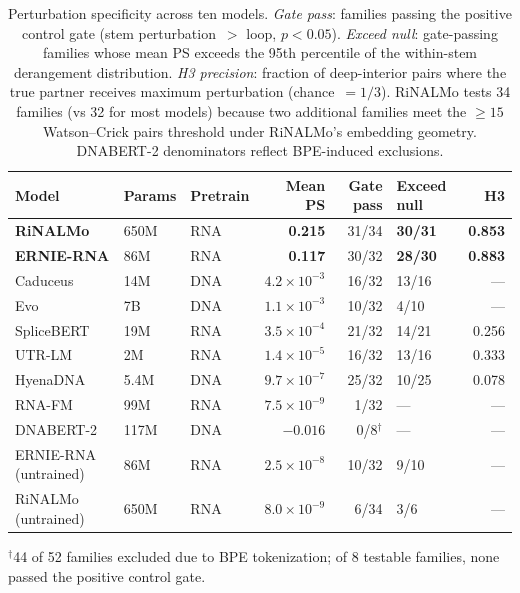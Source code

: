 \documentclass[11pt]{article}
\begin{document}
\begin{table}[ht]
\centering
\caption{Perturbation specificity across ten models.
  \emph{Gate pass}: families passing the positive control gate
  (stem perturbation~$>$ loop, $p < 0.05$).
  \emph{Exceed null}: gate-passing families whose mean PS exceeds the
  95th percentile of the within-stem derangement distribution.
  \emph{H3 precision}: fraction of deep-interior pairs where the
  true partner receives maximum perturbation (chance~$= 1/3$).
  RiNALMo tests 34 families (vs 32 for most models) because two
  additional families meet the $\geq 15$ Watson--Crick pairs threshold
  under RiNALMo's embedding geometry.
  DNABERT-2 denominators reflect BPE-induced exclusions.}
\label{tab:phase6}
\begin{tabular}{lllrrlr}
\toprule
Model & Params & Pretrain & Mean PS & Gate pass & Exceed null & H3 \\
\midrule
\textbf{RiNALMo}    & 650M & RNA & \textbf{0.215}         & 31/34 & \textbf{30/31} & \textbf{0.853} \\
\textbf{ERNIE-RNA}  & 86M  & RNA & \textbf{0.117}         & 30/32 & \textbf{28/30} & \textbf{0.883} \\
Caduceus             & 14M  & DNA & $4.2 \times 10^{-3}$   & 16/32 & 13/16          & ---            \\
Evo                  & 7B   & DNA & $1.1 \times 10^{-3}$   & 10/32 & 4/10           & ---            \\
SpliceBERT           & 19M  & RNA & $3.5 \times 10^{-4}$   & 21/32 & 14/21          & 0.256          \\
UTR-LM               & 2M   & RNA & $1.4 \times 10^{-5}$   & 16/32 & 13/16          & 0.333          \\
HyenaDNA             & 5.4M & DNA & $9.7 \times 10^{-7}$   & 25/32 & 10/25          & 0.078          \\
RNA-FM               & 99M  & RNA & $7.5 \times 10^{-9}$   & 1/32  & ---            & ---            \\
DNABERT-2            & 117M & DNA & $-0.016$               & 0/8$^\dagger$  & ---   & ---            \\
ERNIE-RNA (untrained) & 86M & RNA & $2.5 \times 10^{-8}$  & 10/32 & 9/10           & ---            \\
RiNALMo (untrained)   & 650M & RNA & $8.0 \times 10^{-9}$   & 6/34  & 3/6            & ---            \\
\bottomrule
\end{tabular}
\medskip

\small $^\dagger$44 of 52 families excluded due to BPE tokenization;
of 8 testable families, none passed the positive control gate.
\end{table}
\end{document}
